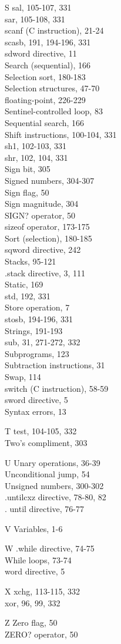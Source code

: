 \documentclass[10pt]{book}
\begin{document}
S
sal, 105-107, 331\\
sar, 105-108, 331\\
scanf (C instruction), 21-24\\

scasb, 191, 194-196, 331\\
sdword directive, 11\\
Search (sequential), 166\\
Selection sort, 180-183\\
Selection structures, 47-70\\
floating-point, 226-229\\
Sentinel-controlled loop, 83\\
Sequential search, 166\\
Shift instructions, 100-104, 331\\
sh1, 102-103, 331\\
shr, 102, 104, 331\\
Sign bit, 305\\
Signed numbers, 304-307\\
Sign flag, 50\\
Sign magnitude, 304\\
SIGN? operator, 50\\
sizeof operator, 173-175\\
Sort (selection), 180-185\\
sqword directive, 242\\
Stacks, 95-121\\
.stack directive, 3, 111\\
Static, 169\\
std, 192, 331\\
Store operation, 7\\
stosb, 194-196, 331\\
Strings, 191-193\\
sub, 31, 271-272, 332\\
Subprograms, 123\\
Subtraction instructions, 31\\
Swap, 114\\
switch (C instruction), 58-59\\
sword directive, 5\\
Syntax errors, 13

T
test, 104-105, 332\\
Two's compliment, 303

U
Unary operations, 36-39\\
Unconditional jump, 54\\
Unsigned numbers, 300-302\\
.untilcxz directive, 78-80, 82\\
. until directive, 76-77

V
Variables, 1-6

W
.while directive, 74-75\\
While loops, 73-74\\
word directive, 5

X
xchg, 113-115, 332\\
xor, 96, 99, 332

Z
Zero flag, 50\\
ZERO? operator, 50





\1
\printindex
\end{document}
